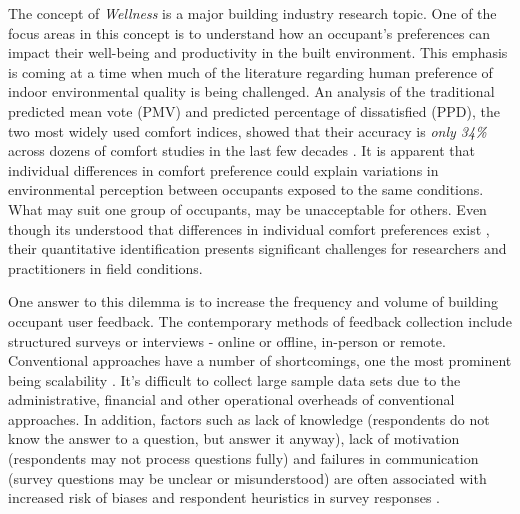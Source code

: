 

The concept of \emph{Wellness} is a major building industry research topic. One of the focus areas in this concept is to understand how an occupant's preferences can impact their well-being and productivity in the built environment. This emphasis is coming at a time when much of the literature regarding human preference of indoor environmental quality is being challenged. An analysis of the traditional predicted mean vote (PMV) and predicted percentage of dissatisfied (PPD), the two most widely used comfort indices, showed that their accuracy is \emph{only 34\%} across dozens of comfort studies in the last few decades \cite{cheung2019analysis, livcina2018development}. It is apparent that individual differences in comfort preference could explain variations in environmental perception between occupants exposed to the same conditions. What may suit one group of occupants, may be unacceptable for others. Even though its understood that differences in individual comfort preferences exist \cite{WANG2018181}, their quantitative identification presents significant challenges for researchers and practitioners in field conditions. 

One answer to this dilemma is to increase the frequency and volume of building occupant user feedback. The contemporary methods of feedback collection include structured surveys or interviews - online or offline, in-person or remote. Conventional approaches have a number of shortcomings, one the most prominent being scalability \cite{oecd}. It's difficult to collect large sample data sets due to the administrative, financial and other operational overheads of conventional approaches. In addition, factors such as lack of knowledge (respondents do not know the answer to a question, but answer it anyway), lack of motivation (respondents may not process questions fully) and failures in communication (survey questions may be unclear or misunderstood) are often associated with increased risk of biases and respondent heuristics in survey responses \cite{bradburn2004asking}. 

